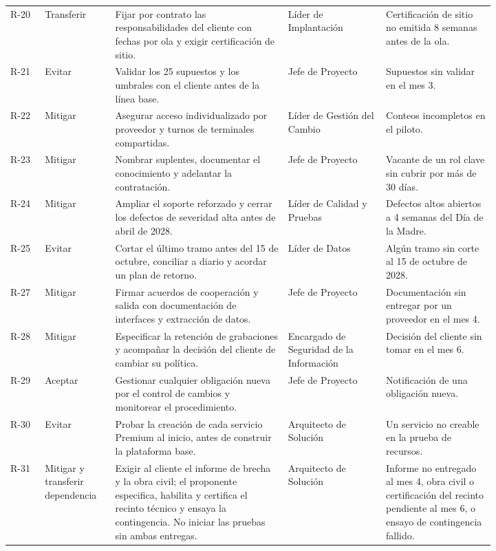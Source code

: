 \documentclass[11pt]{article}
\begin{document}
\begin{longtable}{p{0.060\linewidth}p{0.100\linewidth}p{0.300\linewidth}p{0.170\linewidth}p{0.190\linewidth}}
R-20 & Transferir & Fijar por contrato las responsabilidades del cliente con fechas por ola y exigir certificación de sitio. & Líder de Implantación & Certificación de sitio no emitida 8 semanas antes de la ola. \\
R-21 & Evitar & Validar los 25 supuestos y los umbrales con el cliente antes de la línea base. & Jefe de Proyecto & Supuestos sin validar en el mes 3. \\
R-22 & Mitigar & Asegurar acceso individualizado por proveedor y turnos de terminales compartidas. & Líder de Gestión del Cambio & Conteos incompletos en el piloto. \\
R-23 & Mitigar & Nombrar suplentes, documentar el conocimiento y adelantar la contratación. & Jefe de Proyecto & Vacante de un rol clave sin cubrir por más de 30 días. \\
R-24 & Mitigar & Ampliar el soporte reforzado y cerrar los defectos de severidad alta antes de abril de 2028. & Líder de Calidad y Pruebas & Defectos altos abiertos a 4 semanas del Día de la Madre. \\
R-25 & Evitar & Cortar el último tramo antes del 15 de octubre, conciliar a diario y acordar un plan de retorno. & Líder de Datos & Algún tramo sin corte al 15 de octubre de 2028. \\
R-27 & Mitigar & Firmar acuerdos de cooperación y salida con documentación de interfaces y extracción de datos. & Jefe de Proyecto & Documentación sin entregar por un proveedor en el mes 4. \\
R-28 & Mitigar & Especificar la retención de grabaciones y acompañar la decisión del cliente de cambiar su política. & Encargado de Seguridad de la Información & Decisión del cliente sin tomar en el mes 6. \\
R-29 & Aceptar & Gestionar cualquier obligación nueva por el control de cambios y monitorear el procedimiento. & Jefe de Proyecto & Notificación de una obligación nueva. \\
R-30 & Evitar & Probar la creación de cada servicio Premium al inicio, antes de construir la plataforma base. & Arquitecto de Solución & Un servicio no creable en la prueba de recursos. \\
R-31 & Mitigar y transferir dependencia & Exigir al cliente el informe de brecha y la obra civil; el proponente especifica, habilita y certifica el recinto técnico y ensaya la contingencia. No iniciar las pruebas sin ambas entregas. & Arquitecto de Solución & Informe no entregado al mes 4, obra civil o certificación del recinto pendiente al mes 6, o ensayo de contingencia fallido. \\

\end{longtable}
\end{document}
